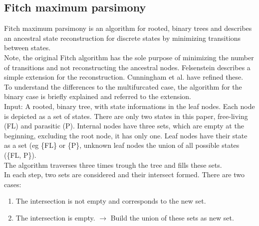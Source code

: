       \subsection{Fitch maximum parsimony}
        Fitch maximum parsimony is an algorithm for rooted, binary trees and describes an ancestral state 
          reconstruction for discrete states \cite{Fitch1971} by minimizing transitions between states. \\
        Note, the original Fitch algorithm has the sole purpose of minimizing the number of transitions 
          and not reconstructing the ancestral nodes. Felsenstein \cite{Felsenstein2003} describes a 
          simple extension for the reconstruction. Cunningham et al. \cite{Cunningham1998} have refined 
          these.   \\
        To understand the differences to the multifurcated case, the algorithm for the binary case is 
          briefly explained and referred to the extension. \\

        Input: A rooted, binary tree, with state informations in the leaf nodes. Each node is depicted as 
          a set of states. There are only two states in this paper, free-living (FL) and parasitic (P). 
          Internal nodes have three sets, which are empty at the beginning, excluding the root node, it 
          has only one. Leaf nodes have their state as a set (eg \{FL\} or \{P\}, unknown leaf nodes the 
          union of all possible states (\{FL, P\}). \\
        The algorithm traverses three times trough the tree and fills these sets. \\
        In each step, two sets are considered and their intersect formed. There are two cases:
        \begin{enumerate}
          \item The intersection is not empty and corresponds to the new set.
          \item The intersection is empty. $\rightarrow$ Build the union of these sets as new set.
        \end{enumerate}


